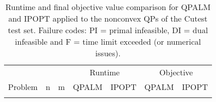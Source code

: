 \documentclass{amsart}
\begin{document}
{\small
	\begin{longtable}[ht]{lcc|cc|cc}
		& & & \multicolumn{2}{c}{Runtime} & \multicolumn{2}{c}{Objective} \\
		\multicolumn{1}{l}{Problem} & n & m & QPALM & IPOPT & QPALM & IPOPT \\
		\hline
		
		\caption{%
			Runtime and final objective value comparison for QPALM and IPOPT applied to the nonconvex QPs of the Cutest test set. Failure codes: PI = primal infeasible, DI = dual infeasible and F = time limit exceeded (or numerical issues).%
		}%
		\label{tab:cutest_long}
	\end{longtable}
}
\end{document}
